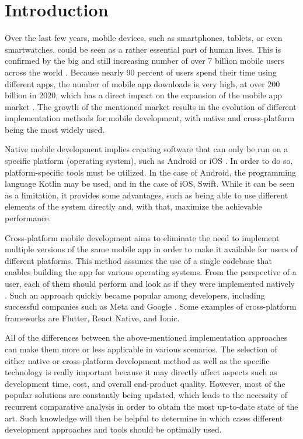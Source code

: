 
\chapter{Introduction}

Over the last few years, mobile devices, such as smartphones, tablets, or even smartwatches, could be seen as a rather essential part of human lives. This is confirmed by the big and still increasing number of over 7 billion mobile users across the world \cite{statista_mobile_users_worldwide}. Because nearly 90 percent of users spend their time using different apps, the number of mobile app downloads is very high, at over 200 billion in 2020, which has a direct impact on the expansion of the mobile app market \cite{techjury_app_statistics}. The growth of the mentioned market results in the evolution of different implementation methods for mobile development, with native and cross-platform being the most widely used.

Native mobile development implies creating software that can only be run on a specific platform (operating system), such as Android or iOS \cite{cma_mobile_ecosystems_report}. In order to do so, platform-specific tools must be utilized. In the case of Android, the programming language Kotlin may be used, and in the case of iOS, Swift. While it can be seen as a limitation, it provides some advantages, such as being able to use different elements of the system directly and, with that, maximize the achievable performance.

Cross-platform mobile development aims to eliminate the need to implement multiple versions of the same mobile app in order to make it available for users of different platforms. This method assumes the use of a single codebase that enables building the app for various operating systems. From the perspective of a user, each of them should perform and look as if they were implemented natively \cite{ijmcmc_decision_framework_cross_plaftorm}. Such an approach quickly became popular among developers, including successful companies such as Meta and Google \cite{kotlin_popular_cross_platform_frameworks}. Some examples of cross-platform frameworks are Flutter, React Native, and Ionic.

All of the differences between the above-mentioned implementation approaches can make them more or less applicable in various scenarios. The selection of either native or cross-platform development method as well as the specific technology is really important because it may directly affect aspects such as development time, cost, and overall end-product quality. However, most of the popular solutions are constantly being updated, which leads to the necessity of recurrent comparative analysis in order to obtain the most up-to-date state of the art. Such knowledge will then be helpful to determine in which cases different development approaches and tools should be optimally used.

